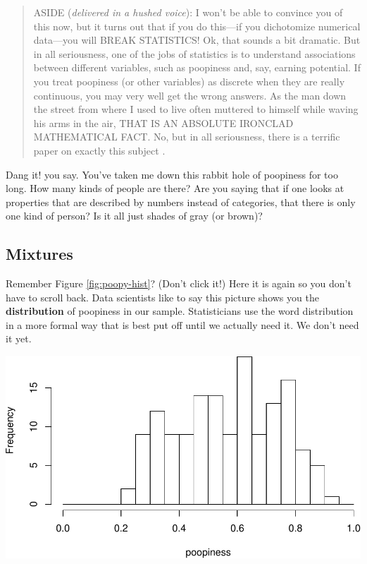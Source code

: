 \documentclass[]{book}
\begin{document}
\begin{quote}
ASIDE (\emph{delivered in a hushed voice}): I won't be able to convince you of this now, but it turns out that if you do this---if you dichotomize numerical data---you will BREAK STATISTICS! Ok, that sounds a bit dramatic. But in all seriousness, one of the jobs of statistics is to understand associations between different variables, such as poopiness and, say, earning potential. If you treat poopiness (or other variables) as discrete when they are really continuous, you may very well get the wrong answers. As the man down the street from where I used to live often muttered to himself while waving his arms in the air, THAT IS AN ABSOLUTE IRONCLAD MATHEMATICAL FACT. No, but in all seriousness, there is a terrific paper on exactly this subject \citep{maccallum2002}.
\end{quote}

Dang it! you say. You've taken me down this rabbit hole of poopiness for too long. How many kinds of people are there? Are you saying that if one looks at properties that are described by numbers instead of categories, that there is only one kind of person? Is it all just shades of gray (or brown)?

\hypertarget{mixtures}{%
\subsection{Mixtures}\label{mixtures}}

Remember Figure \ref{fig:poopy-hist}? (Don't click it!) Here it is again so you don't have to scroll back. Data scientists like to say this picture shows you the \textbf{distribution} of poopiness in our sample. Statisticians use the word distribution in a more formal way that is best put off until we actually need it. We don't need it yet.

\includegraphics{bigquestions-book_files/figure-latex/poopy-hist2-1.pdf}
\end{document}

